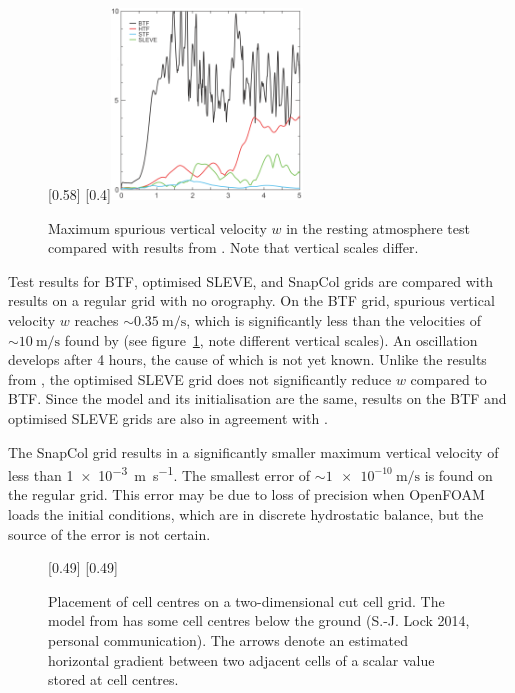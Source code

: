 \begin{figure}
	\captionsetup[subfigure]{position=b}
	\centering
	[0.58\textwidth]{}
	\hfill
	[0.4\textwidth]{\vspace{0.27in}\includegraphics[height=2in]{img/klemp-w.png}}
	\caption{Maximum spurious vertical velocity $w$ in the resting atmosphere test compared with results from \textcite{klemp2011}.  Note that vertical scales differ.}
	\label{fig:resting:w}
\end{figure}

Test results for BTF, optimised SLEVE, and SnapCol grids are compared with results on a regular grid with no orography.  On the BTF grid, spurious vertical velocity $w$ reaches $\sim \SI{0.35}{\meter\per\second}$, which is significantly less than the velocities of $\sim \SI{10}{\meter\per\second}$ found by \textcite{klemp2011} (see figure~\ref{fig:resting:w}, note different vertical scales).  An oscillation develops after 4 hours, the cause of which is not yet known.  Unlike the results from \textcite{klemp2011}, the optimised SLEVE grid does not significantly reduce $w$ compared to BTF.  Since the model and its initialisation are the same, results on the BTF and optimised SLEVE grids are also in agreement with \textcite{weller-shahrokhi2014}.

The SnapCol grid results in a significantly smaller maximum vertical velocity of less than \SI{1e-3}{\meter\per\second}.  The smallest error of $\sim \SI{1e-10}{\meter\per\second}$ is found on the regular grid.  This error may be due to loss of precision when OpenFOAM loads the initial conditions, which are in discrete hydrostatic balance, but the source of the error is not certain.

\begin{figure}
	\captionsetup[subfigure]{position=b}
	\centering
	[0.49\textwidth]{}
	\hfill
	[0.49\textwidth]{}
%
	\caption{Placement of cell centres on a two-dimensional cut cell grid.  The model from \textcite{good2013} has some cell centres below the ground (S.-J. Lock 2014, personal communication).  The arrows denote an estimated horizontal gradient between two adjacent cells of a scalar value stored at cell centres.}
	\label{fig:resting:good}
\end{figure}

